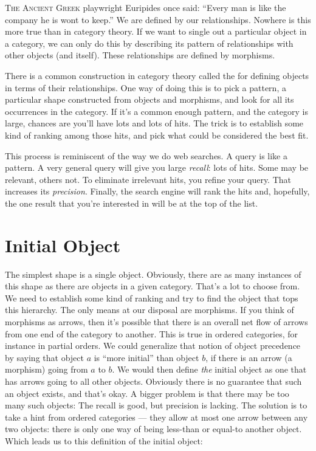 
\lettrine[lhang=0.17]{T}{he Ancient Greek} playwright Euripides once said: ``Every man is like
the company he is wont to keep.'' We are defined by our relationships.
Nowhere is this more true than in category theory. If we want to single
out a particular object in a category, we can only do this by describing
its pattern of relationships with other objects (and itself). These
relationships are defined by morphisms.

There is a common construction in category theory called the
 for defining objects in terms of their
relationships. One way of doing this is to pick a pattern, a particular
shape constructed from objects and morphisms, and look for all its
occurrences in the category. If it's a common enough pattern, and the
category is large, chances are you'll have lots and lots of hits. The
trick is to establish some kind of ranking among those hits, and pick
what could be considered the best fit.

This process is reminiscent of the way we do web searches. A query is
like a pattern. A very general query will give you large \emph{recall}:
lots of hits. Some may be relevant, others not. To eliminate irrelevant
hits, you refine your query. That increases its \emph{precision}.
Finally, the search engine will rank the hits and, hopefully, the one
result that you're interested in will be at the top of the list.

\section{Initial Object}

The simplest shape is a single object. Obviously, there are as many
instances of this shape as there are objects in a given category. That's
a lot to choose from. We need to establish some kind of ranking and try
to find the object that tops this hierarchy. The only means at our
disposal are morphisms. If you think of morphisms as arrows, then it's
possible that there is an overall net flow of arrows from one end of the
category to another. This is true in ordered categories, for instance in
partial orders. We could generalize that notion of object precedence by
saying that object $a$ is ``more initial'' than object $b$, if
there is an arrow (a morphism) going from $a$ to $b$. We would
then define \emph{the} initial object as one that has arrows going to
all other objects. Obviously there is no guarantee that such an object
exists, and that's okay. A bigger problem is that there may be too many
such objects: The recall is good, but precision is lacking. The solution
is to take a hint from ordered categories --- they allow at most one
arrow between any two objects: there is only one way of being less-than
or equal-to another object. Which leads us to this definition of the
initial object:

